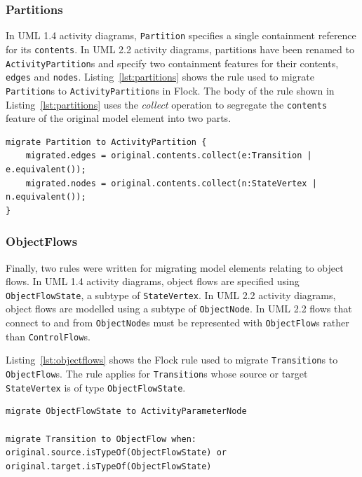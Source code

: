\subsubsection{Partitions}
In UML 1.4 activity diagrams, \texttt{Pa\-rt\-it\-i\-on} specifies a single containment reference for its \texttt{co\-nt\-en\-ts}. In UML 2.2 activity diagrams, partitions have been renamed to \texttt{ActivityPartition}s and specify two containment features for their contents, \texttt{ed\-g\-es} and \texttt{no\-d\-es}. Listing~\ref{lst:partitions} shows the rule used to migrate \texttt{Pa\-rt\-it\-i\-on}s to \texttt{Ac\-ti\-vi\-tyPa\-rt\-it\-i\-on}s in Flock. The body of the rule shown in Listing~\ref{lst:partitions} uses the \emph{collect} operation to segregate the \texttt{co\-nt\-en\-ts} feature of the original model element into two parts.

\begin{lstlisting}[caption=Migrating Partitions, label=lst:partitions, language=Flock]
migrate Partition to ActivityPartition {
	migrated.edges = original.contents.collect(e:Transition | e.equivalent());
	migrated.nodes = original.contents.collect(n:StateVertex | n.equivalent());	
}
\end{lstlisting}


\subsubsection{ObjectFlows}
Finally, two rules were written for migrating model elements relating to object flows. In UML 1.4 activity diagrams, object flows are specified using \texttt{Ob\-je\-ctFl\-owSt\-a\-te}, a subtype of \texttt{St\-at\-eVe\-rt\-ex}. In UML 2.2 activity diagrams, object flows are modelled using a subtype of \texttt{ObjectNode}. In UML 2.2 flows that connect to and from \texttt{Ob\-je\-ctNo\-de}s must be represented with \texttt{Ob\-je\-ctFl\-ow}s rather than \texttt{Co\-nt\-rolFl\-ow}s.

Listing~\ref{lst:objectflows} shows the Flock rule used to migrate \texttt{Tr\-an\-si\-ti\-on}s to \texttt{Ob\-je\-ctFl\-ow}s. The rule applies for \texttt{Tr\-an\-si\-ti\-on}s whose source or target \texttt{St\-at\-eVe\-rt\-ex} is of type \texttt{Ob\-je\-ctFl\-owSt\-ate}.

\begin{lstlisting}[caption=Migrating ObjectFlows, label=lst:objectflows, language=Flock]
migrate ObjectFlowState to ActivityParameterNode

migrate Transition to ObjectFlow when: original.source.isTypeOf(ObjectFlowState) or original.target.isTypeOf(ObjectFlowState)
\end{lstlisting}

